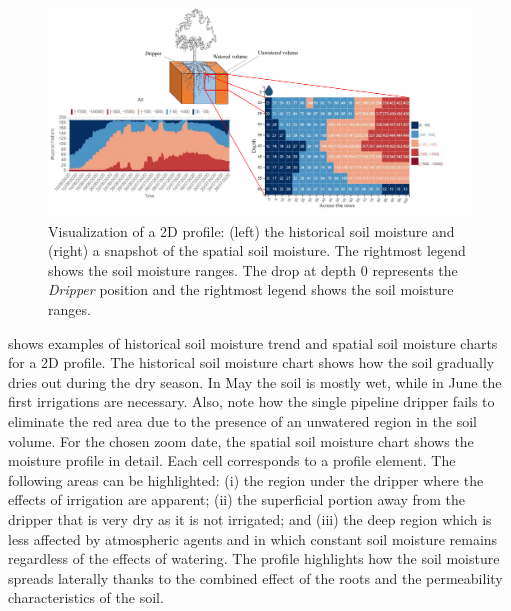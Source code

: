 \begin{figure}[t]
\centering
\includegraphics[scale=.12]{chapters/physics-aware/pluto/img/2d-visualization.pdf}
\caption{Visualization of a 2D profile: (left) the historical soil moisture and (right) a snapshot of the spatial soil moisture. The rightmost legend shows the soil moisture ranges. The drop at depth $0$ represents the \textit{Dripper} position and the rightmost legend shows the soil moisture ranges.}
\label{pluto-fig:2D-visualization}
\end{figure}

 shows examples of historical soil moisture trend and spatial soil moisture charts for a 2D profile.
The historical soil moisture chart shows how the soil gradually dries out during the dry season.
In May the soil is mostly wet, while in June the first irrigations are necessary. 
Also, note how the single pipeline dripper fails to eliminate the red area due to the presence of an unwatered region in the soil volume.
For the chosen zoom date, the spatial soil moisture chart shows the moisture profile in detail. Each cell corresponds to a profile element.
The following areas can be highlighted: (i) the region under the dripper where the effects of irrigation are apparent; (ii) the superficial portion away from the dripper that is very dry as it is not irrigated; and (iii) the deep region which is less affected by atmospheric agents and in which constant soil moisture remains regardless of the effects of watering.
The profile highlights how the soil moisture spreads laterally thanks to the combined effect of the roots and the permeability characteristics of the soil.

